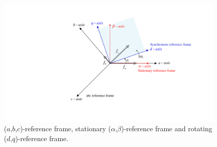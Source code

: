 \begin{figure}[t]
    \centering
    \includegraphics[scale=0.6]{chapters/Fig2.3.pdf}
    \caption{($a$,$b$,$c$)-reference frame, stationary ($\alpha$,$\beta$)-reference frame and rotating ($d$,$q$)-reference frame.}
    \label{Fig:2.3}
\end{figure}

